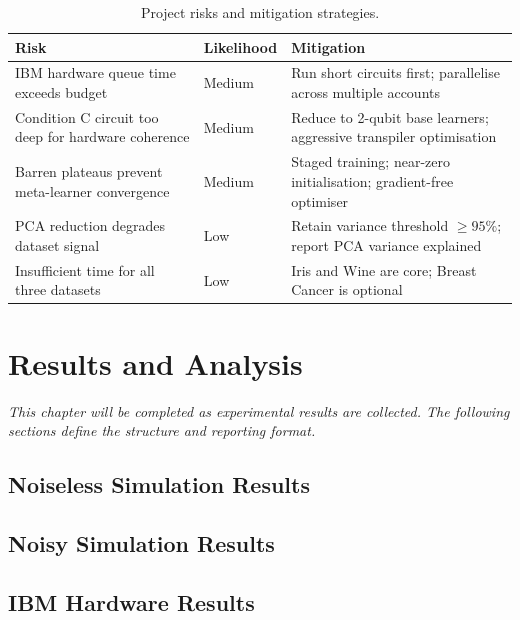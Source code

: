 \documentclass[]{UCD_CS_FYP_Report}
\begin{document}
\begin{table}[h]
\centering
\caption{Project risks and mitigation strategies.}
\label{tab:risks}
\begin{tabular}{p{5cm}p{2cm}p{6cm}}
\toprule
\textbf{Risk} & \textbf{Likelihood} & \textbf{Mitigation} \\
\midrule
IBM hardware queue time exceeds budget & Medium & Run short circuits first; parallelise across multiple accounts \\
Condition C circuit too deep for hardware coherence & Medium & Reduce to 2-qubit base learners; aggressive transpiler optimisation \\
Barren plateaus prevent meta-learner convergence & Medium & Staged training; near-zero initialisation; gradient-free optimiser \\
PCA reduction degrades dataset signal & Low & Retain variance threshold $\geq 95\%$; report PCA variance explained \\
Insufficient time for all three datasets & Low & Iris and Wine are core; Breast Cancer is optional \\
\bottomrule
\end{tabular}
\end{table}

\chapter{Results and Analysis}

\textit{This chapter will be completed as experimental results are collected. The following sections define the structure and reporting format.}

\section{Noiseless Simulation Results}


\section{Noisy Simulation Results}


\section{IBM Hardware Results}
\end{document}
